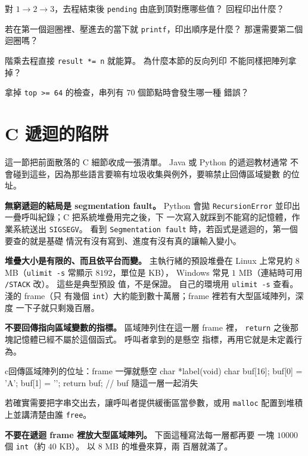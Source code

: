 \begin{drills}[label=drills:rec-explicit-stack]
\item 對 $1 \rightarrow 2 \rightarrow 3$，去程結束後 \texttt{pending}
由底到頂對應哪些值？ 回程印出什麼？
\item 若在第一個迴圈裡、壓進去的當下就 \texttt{printf}，印出順序是什麼？
那還需要第二個迴圈嗎？
\item 階乘去程直接 \texttt{result *= n} 就能算。 為什麼本節的反向列印
不能同樣把陣列拿掉？
\item 拿掉 \texttt{top >= 64} 的檢查，串列有 $70$ 個節點時會發生哪一種
錯誤？
\end{drills}

\section{C 遞迴的陷阱}
\label{sec:rec-pitfalls}

這一節把前面散落的 C 細節收成一張清單。 Java 或 Python 的遞迴教材通常
不會碰到這些，因為那些語言要嘛有垃圾收集與例外，要嘛禁止回傳區域變數
的位址。

\textbf{無窮遞迴的結局是 segmentation fault。} Python 會拋
\texttt{RecursionError} 並印出一疊呼叫紀錄；C 把系統堆疊用完之後，下
一次寫入就踩到不能寫的記憶體，作業系統送出 \texttt{SIGSEGV}。 看到
\texttt{Segmentation fault} 時，若函式是遞迴的，第一個要查的就是基礎
情況有沒有寫到、進度有沒有真的讓輸入變小。

\textbf{堆疊大小是有限的、而且依平台而變。} 主執行緒的預設堆疊在 Linux
上常見約 $8$ MB（\texttt{ulimit -s} 常顯示 $8192$，單位是 KB），
Windows 常見 $1$ MB（連結時可用 \texttt{/STACK} 改）。 這些是典型預設
值，不是保證。 自己的環境用 \texttt{ulimit -s} 查看。 淺的 frame（只
有幾個 \texttt{int}）大約能到數十萬層；frame 裡若有大型區域陣列，深度
一下子就只剩幾百層。

\textbf{不要回傳指向區域變數的指標。} 區域陣列住在這一層 frame 裡，
\texttt{return} 之後那塊記憶體已經不屬於這個函式。 呼叫者拿到的是懸空
指標，再用它就是未定義行為。

\begin{code}{c}{回傳區域陣列的位址：frame 一彈就懸空}
char *label(void) {
    char buf[16];
    buf[0] = 'A';
    buf[1] = '\0';
    return buf;    // buf 隨這一層一起消失
}
\end{code}

若確實需要把字串交出去，讓呼叫者提供緩衝區當參數，或用 \texttt{malloc}
配置到堆積上並講清楚由誰 \texttt{free}。

\textbf{不要在遞迴 frame 裡放大型區域陣列。} 下面這種寫法每一層都再要
一塊 $10000$ 個 \texttt{int}（約 $40$ KB）。 以 $8$ MB 的堆疊來算，兩
百層就滿了。

